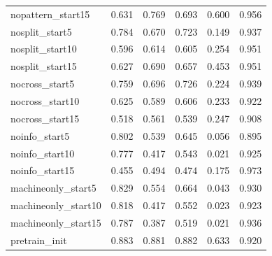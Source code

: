 \begin{table}[htbp]
\begin{tabularx}{\textwidth}{@{}lXXXXX@{}}
nopattern\_start15 & 0.631 & 0.769 & 0.693 & 0.600 & 0.956 \\
nosplit\_start5 & 0.784 & 0.670 & 0.723 & 0.149 & 0.937 \\
nosplit\_start10 & 0.596 & 0.614 & 0.605 & 0.254 & 0.951 \\
nosplit\_start15 & 0.627 & 0.690 & 0.657 & 0.453 & 0.951 \\
nocross\_start5 & 0.759 & 0.696 & 0.726 & 0.224 & 0.939 \\
nocross\_start10 & 0.625 & 0.589 & 0.606 & 0.233 & 0.922 \\
nocross\_start15 & 0.518 & 0.561 & 0.539 & 0.247 & 0.908 \\
noinfo\_start5 & 0.802 & 0.539 & 0.645 & 0.056 & 0.895 \\
noinfo\_start10 & 0.777 & 0.417 & 0.543 & 0.021 & 0.925 \\
noinfo\_start15 & 0.455 & 0.494 & 0.474 & 0.175 & 0.973 \\
machineonly\_start5 & 0.829 & 0.554 & 0.664 & 0.043 & 0.930 \\
machineonly\_start10 & 0.818 & 0.417 & 0.552 & 0.023 & 0.923 \\
machineonly\_start15 & 0.787 & 0.387 & 0.519 & 0.021 & 0.936 \\
pretrain\_init & 0.883 & 0.881 & 0.882 & 0.633 & 0.920 \\
\bottomrule
\end{tabularx}
\end{table}
